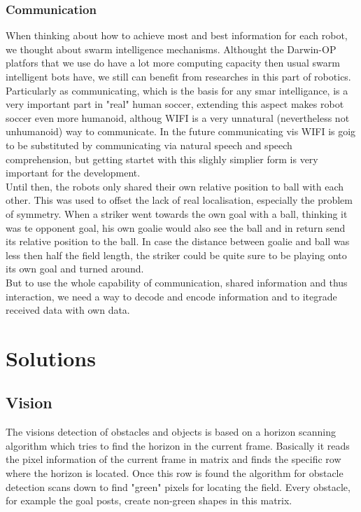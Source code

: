 \documentclass[lnicst,a4paper]{svmultln}
\begin{document}
\subsubsection{Communication}
When thinking about how to achieve most and best information for each robot, we thought about swarm intelligence mechanisms. Althought the Darwin-OP platfors that we use do have a lot more computing capacity then usual swarm intelligent bots have, we still can benefit from researches in this part of robotics. 
\\
Particularly as communicating, which is the basis for any smar intelligance, is a very important part in "real" human soccer, extending this aspect makes robot soccer even more humanoid, althoug WIFI is a very unnatural (nevertheless not unhumanoid) way to communicate. In the future communicating vis WIFI is goig to be substituted by communicating via natural speech and speech comprehension, but getting startet with this slighly simplier form is very important for the development.
\\
Until then, the robots only shared their own relative position to ball with each other. This was used to offset the lack of real localisation, especially the problem of symmetry. When a striker went towards the own goal with a ball, thinking it was te opponent goal, his own goalie would also see the ball and in return send its relative position to the ball. In case the distance between goalie and ball was less then half the field length, the striker could be quite sure to be playing onto its own goal and turned around. 
\\
But to use the whole capability of communication, shared information and thus interaction, we need a way to decode and encode information and to itegrade received data with own data.





\section{Solutions}






\subsection{Vision}
The visions detection of obstacles and objects is based on a horizon scanning algorithm which tries to find the horizon in the current frame. Basically it reads the pixel information of the current frame in matrix and finds the specific row where the horizon is located.
Once this row is found the algorithm for obstacle detection scans down to find "green" pixels for locating the field. Every obstacle, for example the goal posts, create non-green shapes in this matrix.
\end{document}
